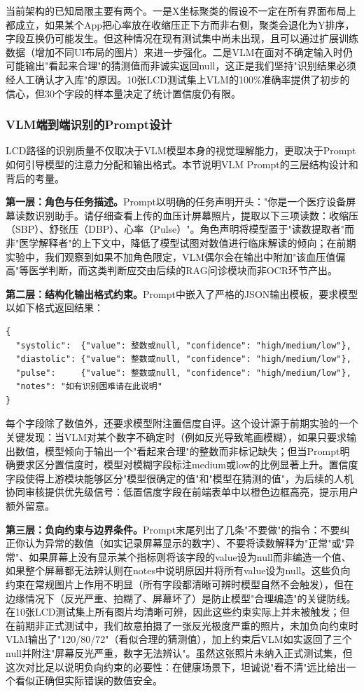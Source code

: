 \documentclass[zihao=-4,a4paper]{ctexart}
\numberwithin{figure}{section}
\numberwithin{table}{section}
\begin{document}
当前架构的已知局限主要有两个。一是X坐标聚类的假设不一定在所有界面布局上都成立，如果某个App把心率放在收缩压正下方而非右侧，聚类会退化为Y排序，字段互换仍可能发生。但这种情况在现有测试集中尚未出现，且可以通过扩展训练数据（增加不同UI布局的图片）来进一步强化。二是VLM在面对不确定输入时仍可能输出"看起来合理"的猜测值而非诚实返回null，这正是我们坚持"识别结果必须经人工确认才入库"的原因。10张LCD测试集上VLM的100\%准确率提供了初步的信心，但30个字段的样本量决定了统计置信度仍有限。

\subsubsection{VLM端到端识别的Prompt设计}

LCD路径的识别质量不仅取决于VLM模型本身的视觉理解能力，更取决于Prompt如何引导模型的注意力分配和输出格式。本节说明VLM Prompt的三层结构设计和背后的考量。

\textbf{第一层：角色与任务描述。}Prompt以明确的任务声明开头："你是一个医疗设备屏幕读数识别助手。请仔细查看上传的血压计屏幕照片，提取以下三项读数：收缩压（SBP）、舒张压（DBP）、心率（Pulse）"。角色声明将模型置于"读数提取者"而非"医学解释者"的上下文中，降低了模型试图对数值进行临床解读的倾向；在前期实验中，我们观察到如果不加角色限定，VLM偶尔会在输出中附加"该血压值偏高"等医学判断，而这类判断应交由后续的RAG问诊模块而非OCR环节产出。

\textbf{第二层：结构化输出格式约束。}Prompt中嵌入了严格的JSON输出模板，要求模型以如下格式返回结果：

\begin{lstlisting}[basicstyle=\ttfamily\zihao{5}, numbers=none]
{
  "systolic":  {"value": 整数或null, "confidence": "high/medium/low"},
  "diastolic": {"value": 整数或null, "confidence": "high/medium/low"},
  "pulse":     {"value": 整数或null, "confidence": "high/medium/low"},
  "notes": "如有识别困难请在此说明"
}
\end{lstlisting}

每个字段除了数值外，还要求模型附注置信度自评。这个设计源于前期实验的一个关键发现：当VLM对某个数字不确定时（例如反光导致笔画模糊），如果只要求输出数值，模型倾向于输出一个"看起来合理"的整数而非标记缺失；但当Prompt明确要求区分置信度时，模型对模糊字段标注medium或low的比例显著上升。置信度字段使得上游模块能够区分"模型很确定的值"和"模型在猜测的值"，为后续的人机协同审核提供优先级信号：低置信度字段在前端表单中以橙色边框高亮，提示用户额外留意。

\textbf{第三层：负向约束与边界条件。}Prompt末尾列出了几条"不要做"的指令：不要纠正你认为异常的数值（如实记录屏幕显示的数字）、不要将读数解释为"正常"或"异常"、如果屏幕上没有显示某个指标则将该字段的value设为null而非编造一个值、如果整个屏幕都无法辨认则在notes中说明原因并将所有value设为null。这些负向约束在常规图片上作用不明显（所有字段都清晰可辨时模型自然不会触发），但在边缘情况下（反光严重、拍糊了、屏幕坏了）是防止模型"合理编造"的关键防线。在10张LCD测试集上所有图片均清晰可辨，因此这些约束实际上并未被触发；但在前期非正式测试中，我们故意拍摄了一张反光极度严重的照片，未加负向约束时VLM输出了"120/80/72"（看似合理的猜测值），加上约束后VLM如实返回了三个null并附注"屏幕反光严重，数字无法辨认"。虽然这张照片未纳入正式测试集，但这次对比足以说明负向约束的必要性：在健康场景下，坦诚说"看不清"远比给出一个看似正确但实际错误的数值安全。
\end{document}
